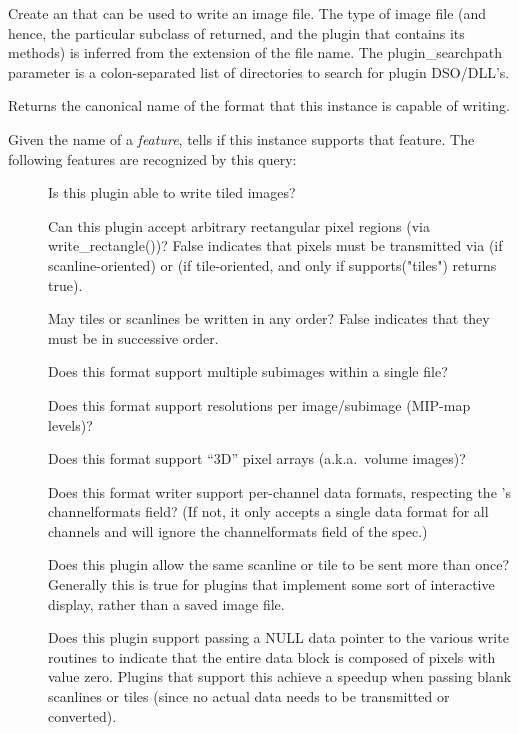 
Create an \ImageOutput that can be used to write an image file.  The
type of image file (and hence, the particular subclass of \ImageOutput
returned, and the plugin that contains its methods) is inferred from the
extension of the file name.  The {\kw plugin_searchpath} parameter is a
colon-separated list of directories to search for \product plugin
DSO/DLL's.

\apiend

Returns the canonical name of the format that this \ImageOutput
instance is capable of writing.
\apiend

\label{sec:supportsfeaturelist}
Given the name of a \emph{feature}, tells if this \ImageOutput 
instance supports that feature.  The following features are recognized
by this query:
\begin{description}
\item[\spc] \spc 
\item[\rm {}] Is this plugin able to write tiled images?
\item[\rm {}] Can this plugin accept arbitrary rectangular
  pixel regions (via {\kw write_rectangle()})?  False indicates that
  pixels must be transmitted via \writescanline (if
  scanline-oriented) or \writetile (if tile-oriented, and only if
  {\kw supports("tiles")} returns true).
\item[\rm {}] May tiles or scanlines be written in any
  order?  False indicates that they must be in successive order.
\item[\rm {}] Does this format support multiple subimages
  within a single file?
\item[\rm {}] Does this format support resolutions per
  image/subimage (MIP-map levels)?
\item[\rm {}] Does this format support ``3D'' pixel arrays
  (a.k.a.\ volume images)?
\item[\rm {}] Does this format writer support per-channel
  data formats, respecting the \ImageSpec's {\cf channelformats}
  field?  (If not, it only accepts a single data format for all
  channels and will ignore the {\cf channelformats} field of the spec.)
\item[\rm {}] Does this plugin allow the same scanline or
  tile to be sent more than once?  Generally this is true for plugins
  that implement some sort of interactive display, rather than a saved
  image file.
\item[\rm {}] Does this plugin support passing a NULL data
  pointer to the various {\kw write} routines to indicate that the
  entire data block is composed of pixels with value zero.  Plugins
  that support this achieve a speedup when passing blank scanlines or
  tiles (since no actual data needs to be transmitted or converted).
\end{description}

